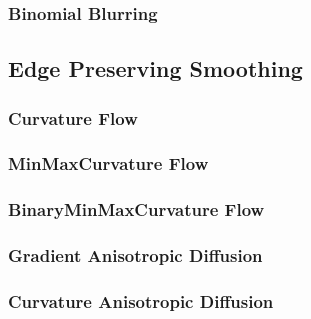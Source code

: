 \subsubsection{Binomial Blurring}
\label{sec:BinomialBlurImageFilter}

%



\subsection{Edge Preserving Smoothing}
\label{sec:EdgePreservingSmoothingFilters}


\subsubsection{Curvature Flow}
\label{sec:CurvatureFlowImageFilter}

%


\subsubsection{MinMaxCurvature Flow}
\label{sec:MinMaxCurvatureFlowImageFilter}

%



\subsubsection{BinaryMinMaxCurvature Flow}
\label{sec:BinaryMinMaxCurvatureFlowImageFilter}

%


\subsubsection{Gradient Anisotropic Diffusion}
\label{sec:GradientAnisotropicDiffusionImageFilter}

%



\subsubsection{Curvature Anisotropic Diffusion}
\label{sec:CurvatureAnisotropicDiffusionImageFilter}

%



